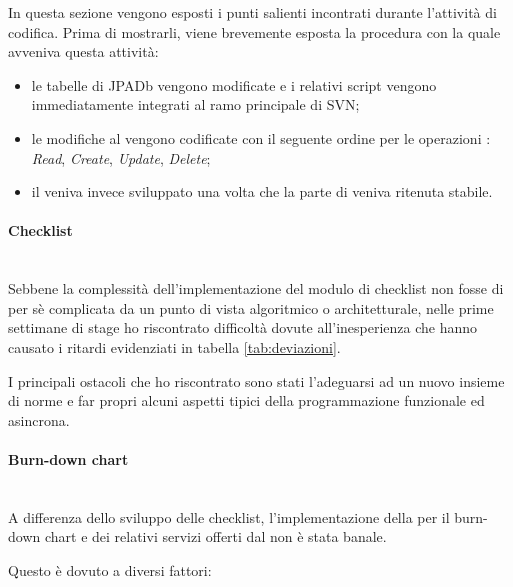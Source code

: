 In questa sezione vengono esposti i punti salienti incontrati durante
l'attività di codifica. Prima di mostrarli, viene brevemente esposta la
procedura con la quale avveniva questa attività:

\begin{itemize}
\item le tabelle di JPADb vengono modificate e i relativi script vengono
  immediatamente integrati al ramo principale di SVN;
\item le modifiche al \BKEND{} vengono codificate con il seguente ordine per le
  operazioni : \emph{Read}, \emph{Create}, \emph{Update},
  \emph{Delete};
\item il \FREND{} veniva invece sviluppato una volta che la parte di \BKEND{}
  veniva ritenuta stabile.
\end{itemize}

\paragraph{Checklist} \mbox{} \\

Sebbene la complessità dell'implementazione del modulo di checklist non fosse
di per sè complicata da un punto di vista algoritmico o architetturale, nelle
prime settimane di stage ho riscontrato difficoltà dovute all'inesperienza che
hanno causato i ritardi evidenziati in tabella \ref{tab:deviazioni}.

I principali ostacoli che ho riscontrato sono stati l'adeguarsi ad un nuovo
insieme di norme e far propri alcuni aspetti tipici della programmazione
funzionale ed asincrona.

\paragraph{Burn-down chart} \mbox{} \\

A differenza dello sviluppo delle checklist, l'implementazione della
 per il burn-down chart e dei relativi servizi offerti dal
\BKEND{} non è stata banale.

Questo è dovuto a diversi fattori:

